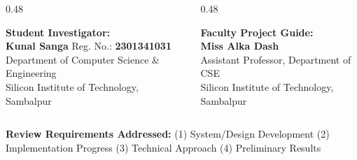 \documentclass[aspectratio=169, 10pt]{beamer}
\begin{document}
\begin{frame}[plain]
  \begin{columns}[T]
    \begin{column}{0.48\textwidth}
      \begin{tcolorbox}[colback=soclight,colframe=bordergray,arc=1.5mm,boxrule=0.6pt,top=4pt,bottom=4pt,left=6pt,right=6pt]
        {\scriptsize\textbf{\textcolor{socnavy}{Student Investigator:}}}\\[2pt]
        {\small\textbf{Kunal Sanga}} \hfill {\scriptsize Reg. No.: \textbf{2301341031}}\\[1pt]
        {\scriptsize Department of Computer Science \& Engineering}\\[1pt]
        {\scriptsize Silicon Institute of Technology, Sambalpur}
      \end{tcolorbox}
    \end{column}
    \begin{column}{0.48\textwidth}
      \begin{tcolorbox}[colback=soclight,colframe=bordergray,arc=1.5mm,boxrule=0.6pt,top=4pt,bottom=4pt,left=6pt,right=6pt]
        {\scriptsize\textbf{\textcolor{socnavy}{Faculty Project Guide:}}}\\[2pt]
        {\small\textbf{Miss Alka Dash}}\\[1pt]
        {\scriptsize Assistant Professor, Department of CSE}\\[1pt]
        {\scriptsize Silicon Institute of Technology, Sambalpur}
      \end{tcolorbox}
    \end{column}
  \end{columns}

  \vspace{0.15cm}
  \centering
  \textcolor{socmuted}{\scriptsize\textbf{Review Requirements Addressed:} (1) System/Design Development \quad\textbar\quad (2) Implementation Progress \quad\textbar\quad (3) Technical Approach \quad\textbar\quad (4) Preliminary Results}
\end{frame}
\end{document}
